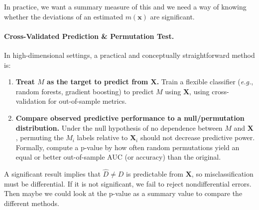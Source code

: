 \documentclass[11pt]{article}
\begin{document}
In practice, we want a summary measure of this and we need a way of knowing whether the deviations of an estimated $m(\mathbf{x})$ are significant.

\paragraph{Cross-Validated Prediction \& Permutation Test.}
In high-dimensional settings, a practical and conceptually straightforward method is:
\begin{enumerate}
  \item \textbf{Treat $M$ as the target to predict from $\mathbf{X}$.} Train a flexible classifier (\emph{e.g.}, random forests, gradient boosting) to predict $M$ using $\mathbf{X}$, using cross-validation for out-of-sample metrics.
  \item \textbf{Compare observed predictive performance to a null/permutation distribution.} Under the null hypothesis of no dependence between $M$ and $\mathbf{X}$, permuting the $M_i$ labels relative to $\mathbf{X}_i$ should not decrease predictive power. Formally, compute a p-value by how often random permutations yield an equal or better out-of-sample AUC (or accuracy) than the original.
\end{enumerate}
A significant result implies that $\widehat{D}\neq D$ is predictable from $\mathbf{X}$, so misclassification must be differential. If it is not significant, we fail to reject nondifferential errors. Then maybe we could look at the p-value as a summary value to compare the different methods.
\end{document}
